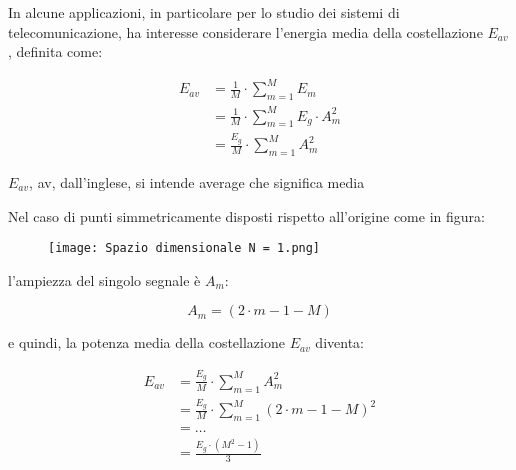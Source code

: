 In alcune applicazioni, in particolare per lo studio dei sistemi di telecomunicazione, 
ha interesse considerare l'energia media della costellazione $E_{av}$, definita come: 

{
    \Large 
    \begin{equation}
        \begin{split}
            E_{av}
            &=
            \frac{1}{M} 
            \cdot 
            \sum_{m = 1}^{M} 
            E_m
            \\
            &= 
            \frac{1}{M} 
            \cdot 
            \sum_{m = 1}^{M} 
            E_g \cdot A_m ^{2}
            \\
            &= 
            \frac{E_g}{M}
            \cdot 
            \sum_{m = 1}^{M}
            A_m ^{2}
        \end{split}
    \end{equation}
}


\begin{tcolorbox}
    $E_{av}$, av, dall'inglese, si intende average che significa media
\end{tcolorbox}

\newpage 

Nel caso di punti simmetricamente disposti rispetto all'origine come in figura: 

\begin{figure}[h]
    \centering
    \texttt{[image: Spazio dimensionale N = 1.png]}
\end{figure}

l'ampiezza del singolo segnale è $A_m$: 

{
    \Large 
    \begin{equation}
        A_m 
        = 
        \left( 2 \cdot m - 1 - M\right)
    \end{equation}
}

e quindi, la potenza media della costellazione $E_{av}$ diventa: 

{
    \Large 
    \begin{equation}
        \begin{split}
            E_{av}
            &= 
            \frac{E_g}{M}
            \cdot
            \sum_{m = 1}^{M}
            A_m ^{2}
            \\
            &= 
            \frac{E_g}{M}
            \cdot
            \sum_{m = 1}^{M}
            \left( 2 \cdot m - 1 - M\right)^{2}
            \\
            &= 
            \dots
            \\
            &= 
            \frac{E_g \cdot \left(M^{2} - 1\right)}{3}
        \end{split}
    \end{equation}
}

